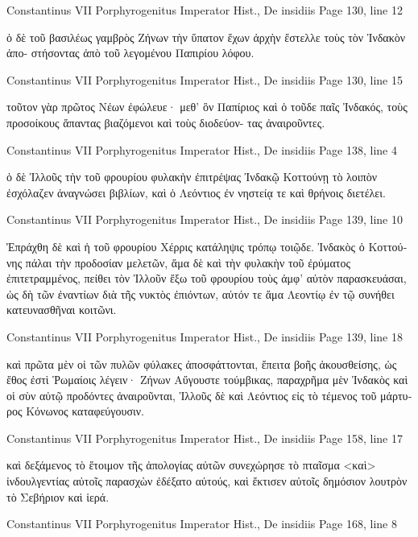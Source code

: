 \documentclass[12pt,letterpaper,twoside,final]{memoir}
\begin{document}
\begin{greek}
Constantinus VII Porphyrogenitus Imperator Hist., De insidiis 
Page 130, line 12

                                   ὁ δὲ τοῦ βασιλέως γαμβρὸς 
Ζήνων τὴν ὕπατον ἔχων ἀρχὴν ἔστελλε τοὺς τὸν Ἰνδακὸν ἀπο-
στήσοντας ἀπὸ τοῦ λεγομένου Παπιρίου λόφου. 



Constantinus VII Porphyrogenitus Imperator Hist., De insidiis 
Page 130, line 15

                                                    τοῦτον γὰρ 
πρῶτος Νέων ἐφώλευε· μεθ' ὃν Παπίριος καὶ ὁ τοῦδε παῖς 
Ἰνδακός, τοὺς προσοίκους ἅπαντας βιαζόμενοι καὶ τοὺς διοδεύον-
τας ἀναιροῦντες. 



Constantinus VII Porphyrogenitus Imperator Hist., De insidiis 
Page 138, line 4

        ὁ δὲ Ἰλλοῦς τὴν τοῦ φρουρίου φυλακὴν ἐπιτρέψας Ἰνδακῷ 
Κοττούνῃ τὸ λοιπὸν ἐσχόλαζεν ἀναγνώσει βιβλίων, καὶ ὁ Λεόντιος 
ἐν νηστείᾳ τε καὶ θρήνοις διετέλει. 



Constantinus VII Porphyrogenitus Imperator Hist., De insidiis 
Page 139, line 10

Ἐπράχθη δὲ καὶ ἡ τοῦ φρουρίου Χέρρις κατάληψις τρόπῳ 
τοιῷδε. Ἰνδακὸς ὁ Κοττούνης πάλαι τὴν προδοσίαν μελετῶν, ἅμα 
δὲ καὶ τὴν φυλακὴν τοῦ ἐρύματος ἐπιτετραμμένος, πείθει τὸν 
Ἰλλοῦν ἔξω τοῦ φρουρίου τοὺς ἀμφ' αὐτὸν παρασκευάσαι, ὡς δὴ 
τῶν ἐναντίων διὰ τῆς νυκτὸς ἐπιόντων, αὐτόν τε ἅμα Λεοντίῳ ἐν 
τῷ συνήθει κατευνασθῆναι κοιτῶνι. 



Constantinus VII Porphyrogenitus Imperator Hist., De insidiis 
Page 139, line 18

καὶ πρῶτα μὲν οἱ τῶν πυλῶν φύλακες ἀποσφάττονται, ἔπειτα βοῆς 
ἀκουσθείσης, ὡς ἔθος ἐστὶ Ῥωμαίοις λέγειν· Ζήνων Αὔγουστε 
τούμβικας, παραχρῆμα μὲν Ἰνδακὸς καὶ οἱ σὺν αὐτῷ προδόντες 
ἀναιροῦνται, Ἰλλοῦς δὲ καὶ Λεόντιος εἰς τὸ τέμενος τοῦ μάρτυρος 
Κόνωνος καταφεύγουσιν. 



Constantinus VII Porphyrogenitus Imperator Hist., De insidiis 
Page 158, line 17

                 καὶ δεξάμενος τὸ ἕτοιμον τῆς ἀπολογίας αὐτῶν 
συνεχώρησε τὸ πταῖσμα <καὶ> ἰνδουλγεντίας αὐτοῖς παρασχὼν 
ἐδέξατο αὐτούς, καὶ ἔκτισεν αὐτοῖς δημόσιον λουτρὸν τὸ Σεβήριον 
καὶ ἱερά. 



Constantinus VII Porphyrogenitus Imperator Hist., De insidiis 
Page 168, line 8


\end{greek}
\end{document}
